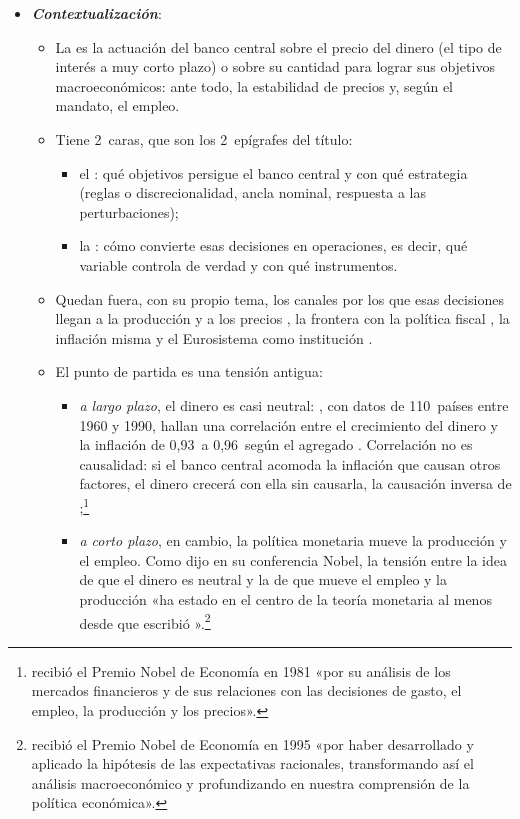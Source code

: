 \documentclass[11pt]{article}
\begin{document}
\begin{itemize}
\item \textbf{\emph{Contextualización}}:
  \begin{itemize}
  \item La  es la actuación del banco central sobre el precio del dinero (el tipo de interés a muy corto plazo) o sobre su cantidad para lograr sus objetivos macroeconómicos: ante todo, la estabilidad de precios y, según el mandato, el empleo.
  \item Tiene 2~caras, que son los 2~epígrafes del título:
    \begin{itemize}
    \item el : qué objetivos persigue el banco central y con qué estrategia (reglas o discrecionalidad, ancla nominal, respuesta a las perturbaciones);
    \item la : cómo convierte esas decisiones en operaciones, es decir, qué variable controla de verdad y con qué instrumentos.
    \end{itemize}
  \item Quedan fuera, con su propio tema, los canales por los que esas decisiones llegan a la producción y a los precios , la frontera con la política fiscal , la inflación misma  y el Eurosistema como institución .
  \item El punto de partida es una tensión antigua:
    \begin{itemize}
    \item \emph{a largo plazo}, el dinero es casi neutral: \textcite{McCandlessWeber1995}, con datos de 110~países entre 1960 y 1990, hallan una correlación entre el crecimiento del dinero y la inflación de 0,93~a 0,96~según el agregado . Correlación no es causalidad: si el banco central acomoda la inflación que causan otros factores, el dinero crecerá con ella sin causarla\nocite{Walsh2017Monetary}, la causación inversa de \textcite{Tobin1970Money} ;\footnote{ recibió el Premio Nobel de Economía en 1981 «por su análisis de los mercados financieros y de sus relaciones con las decisiones de gasto, el empleo, la producción y los precios»\nocite{Nobel1981Tobin}.}
    \item \emph{a corto plazo}, en cambio, la política monetaria mueve la producción y el empleo. Como dijo \textcite{Lucas1996Nobel} en su conferencia Nobel, la tensión entre la idea de que el dinero es neutral y la de que mueve el empleo y la producción «ha estado en el centro de la teoría monetaria al menos desde que escribió ».\footnote{ recibió el Premio Nobel de Economía en 1995 «por haber desarrollado y aplicado la hipótesis de las expectativas racionales, transformando así el análisis macroeconómico y profundizando en nuestra comprensión de la política económica»\nocite{NobelPrize1995Lucas}.}

\end{itemize}
\end{itemize}
\end{itemize}
\end{document}
